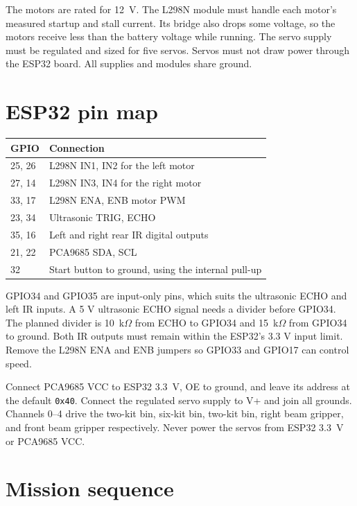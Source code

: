 \documentclass[10pt]{article}
\begin{document}
The motors are rated for 12~V. The L298N module must handle each motor's measured startup and stall current. Its bridge also drops some voltage, so the motors receive less than the battery voltage while running. The servo supply must be regulated and sized for five servos. Servos must not draw power through the ESP32 board. All supplies and modules share ground.

\section*{ESP32 pin map}

\begin{tabular}{@{}ll@{}}
\toprule
GPIO & Connection \\
\midrule
25, 26 & L298N IN1, IN2 for the left motor \\
27, 14 & L298N IN3, IN4 for the right motor \\
33, 17 & L298N ENA, ENB motor PWM \\
23, 34 & Ultrasonic TRIG, ECHO \\
35, 16 & Left and right rear IR digital outputs \\
21, 22 & PCA9685 SDA, SCL \\
32 & Start button to ground, using the internal pull-up \\
\bottomrule
\end{tabular}

GPIO34 and GPIO35 are input-only pins, which suits the ultrasonic ECHO and left IR inputs. A 5 V ultrasonic ECHO signal needs a divider before GPIO34. The planned divider is 10~k$\Omega$ from ECHO to GPIO34 and 15~k$\Omega$ from GPIO34 to ground. Both IR outputs must remain within the ESP32's 3.3 V input limit. Remove the L298N ENA and ENB jumpers so GPIO33 and GPIO17 can control speed.

Connect PCA9685 VCC to ESP32 3.3~V, OE to ground, and leave its address at the default \texttt{0x40}. Connect the regulated servo supply to V+ and join all grounds. Channels 0--4 drive the two-kit bin, six-kit bin, two-kit bin, right beam gripper, and front beam gripper respectively. Never power the servos from ESP32 3.3~V or PCA9685 VCC.

\newpage
\section*{Mission sequence}
\end{document}
